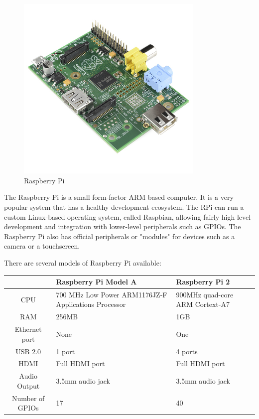 \documentclass[10pt]{article}
\begin{document}
\begin{figure}[h]
\centering
\caption{Raspberry Pi}
\label{Raspberry Pi}
\includegraphics[height=9cm]{images/Raspberry-Pi.jpg}
\end{figure}
The Raspberry Pi is a small form-factor ARM based computer. It is a very popular system that has a healthy development ecosystem. The RPi can run a custom Linux-based operating system, called Raspbian, allowing fairly high level development and integration with lower-level peripherals such as GPIOs. The Raspberry Pi also has official peripherals or "modules" for devices such as a camera or a touchscreen.

There are several models of Raspberry Pi available:

\begin{center}
	\begin{tabular}{| c | p{6cm} | p{6cm} |}
		\hline
		  & Raspberry Pi Model A & Raspberry Pi 2 \\ \hline
		CPU & 700 MHz Low Power ARM1176JZ-F Applications Processor & 900MHz quad-core ARM Cortext-A7 \\ \hline
		RAM & 256MB & 1GB \\ \hline
		Ethernet port & None & One \\ \hline
		USB 2.0 & 1 port & 4 ports \\ \hline
		HDMI & Full HDMI port & Full HDMI port \\ \hline
		Audio Output & 3.5mm audio jack & 3.5mm audio jack \\ \hline
		Number of GPIOs & 17 & 40 \\ \hline
	\end{tabular}
\end{center}
\end{document}
